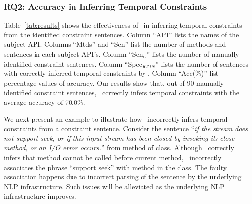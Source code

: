 %
%

\subsubsection{RQ2: Accuracy in Inferring Temporal Constraints}

Table~\ref{tab:results} shows the effectiveness of \tool\ in inferring temporal constraints from the identified constraint sentences.
Column ``API'' lists the names of the subject API. 
Columns ``Mtds'' and ``Sen'' list the number of methods and sentences in each subject API's.
Column ``Sen$_C$'' lists the number of manually identified constraint sentences.
Column ``Spec$_{ICON}$'' lists the number of sentences with correctly inferred temporal constraints by \tool. 
Column ``Acc(\%)'' list percentage values of accuracy. 
Our results show that, out of 90 manually identified constraint sentences, \tool\ correctly infers temporal constraints with the average accuracy of 70.0\%.

We next present an example to illustrate how \tool\ incorrectly infers temporal constraints from a constraint sentence. Consider the sentence ``\textit{if the stream does not support seek, or if this input stream has been closed by invoking its close method, or an I/O error occurs.}'' from  method of  class. Although \tool\ correctly infers that method  cannot be called before current method, \tool\ incorrectly associates the phrase ``support seek'' with method  in the class. The faulty association happens due to incorrect parsing of the sentence by the underlying NLP infrastructure. Such issues will be alleviated as the underlying NLP infrastructure improves.   


